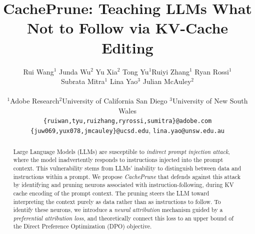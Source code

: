 \documentclass[11pt]{article}
\title{CachePrune: Teaching LLMs What Not to Follow via KV-Cache Editing}
\author{\begin{tabular}{c} Rui Wang$^{1}$  \quad  Junda Wu$^{2}$ \quad  Yu Xia$^{2}$ \quad Tong Yu$^{1}$\quad  Ruiyi Zhang$^1$ \quad Ryan Rossi$^1$\\   
 Subrata Mitra$^{1}$ \quad Lina Yao$^{3}$ \quad Julian McAuley$^{2}$\end{tabular}\\
$^1$Adobe Research\quad$^2$University of California San Diego \quad $^3$University of New South Wales  \\
\texttt{\{ruiwan,tyu,ruizhang,ryrossi,sumitra\}@adobe.com} \\
\texttt{\{juw069,yux078,jmcauley\}@ucsd.edu}, \texttt{lina.yao@unsw.edu.au}}
\begin{document}
\maketitle
\begin{abstract}
Large Language Models (LLMs) are susceptible to \textit{indirect prompt injection attack}, where the model inadvertently responds to instructions injected into the prompt context.
This vulnerability stems from LLMs' inability to distinguish between data and instructions within a prompt. 
We propose \textit{CachePrune} that defends against this attack 
by identifying and pruning neurons associated with instruction-following,
during KV cache encoding of the prompt context. 
The pruning steers the LLM toward interpreting the context purely as data rather than as instructions to follow.
To identify these neurons, we introduce a \textit{neural attribution} mechanism guided by a \textit{preferential attribution loss}, and theoretically connect this loss to an upper bound of the Direct Preference Optimization (DPO) objective.

\end{abstract}
\end{document}
